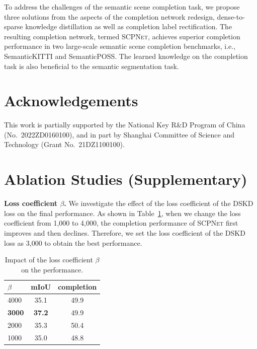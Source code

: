 \documentclass[10pt,twocolumn,letterpaper]{article}
\newcommand{\methodname}{\textsc{SCPNet}}
\begin{document}
To address the challenges of the semantic scene completion task, we propose three solutions from the aspects of the completion network redesign, dense-to-sparse knowledge distillation as well as completion label rectification. The resulting completion network, termed \methodname{}, achieves superior completion performance in two large-scale semantic scene completion benchmarks, i.e., SemanticKITTI and SemanticPOSS. The learned knowledge on the completion task is also beneficial to the semantic segmentation task.

\section*{Acknowledgements}

This work is partially supported by the National Key R\&D Program of China (No.\ 2022ZD0160100), and in part by Shanghai Committee of Science and Technology (Grant No.\ 21DZ1100100).





\appendix
\section{Ablation Studies (Supplementary)}

\textbf{Loss coefficient $\beta$.}
We investigate the effect of the loss coefficient of the DSKD loss on the final performance. As shown in Table~\ref{tab:beta}, when we change the loss coefficient from 1,000 to 4,000, the completion performance of \methodname{} first improves and then declines. Therefore, we set the loss coefficient of the DSKD loss as 3,000 to obtain the best performance.

\begin{table}[htbp]
\centering
\caption{Impact of the loss coefficient $\beta$ on the performance.}
\label{tab:beta}
\begin{tabular}{lcc}
\toprule
$\beta$ & mIoU & completion \\
\midrule
4000 & 35.1 & 49.9 \\
\textbf{3000} & \textbf{37.2} & 49.9 \\
2000 & 35.3 & 50.4 \\
1000 & 35.0 & 48.8 \\
\bottomrule
\end{tabular}
\end{table}
\end{document}
